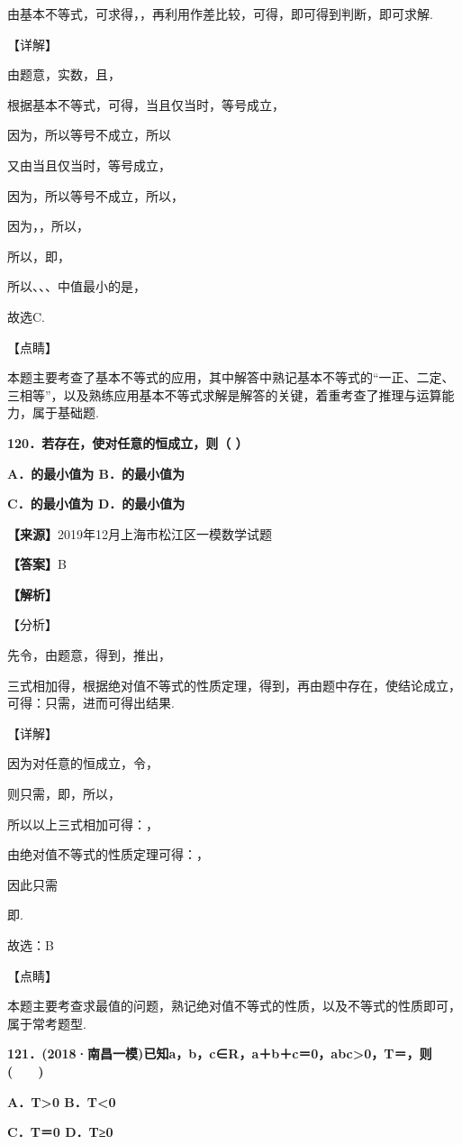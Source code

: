 由基本不等式，可求得，，再利用作差比较，可得，即可得到判断，即可求解.

【详解】

由题意，实数，且，

根据基本不等式，可得，当且仅当时，等号成立，

因为，所以等号不成立，所以

又由当且仅当时，等号成立，

因为，所以等号不成立，所以，

因为，，所以，

所以，即，

所以、、、中值最小的是，

故选C.

【点睛】

本题主要考查了基本不等式的应用，其中解答中熟记基本不等式的``一正、二定、三相等''，以及熟练应用基本不等式求解是解答的关键，着重考查了推理与运算能力，属于基础题.

\textbf{120．若存在，使对任意的恒成立，则（ ）}

\textbf{A．的最小值为 B．的最小值为}

\textbf{C．的最小值为 D．的最小值为}

\textbf{【来源】}2019年12月上海市松江区一模数学试题

\textbf{【答案】}B

\textbf{【解析】}

【分析】

先令，由题意，得到，推出，

三式相加得，根据绝对值不等式的性质定理，得到，再由题中存在，使结论成立，可得：只需，进而可得出结果.

【详解】

因为对任意的恒成立，令，

则只需，即，所以，

所以以上三式相加可得：，

由绝对值不等式的性质定理可得：，

因此只需

即.

故选：B

【点睛】

本题主要考查求最值的问题，熟记绝对值不等式的性质，以及不等式的性质即可，属于常考题型.

\textbf{121．(2018·南昌一模)已知a，b，c∈R，a＋b＋c＝0，abc\textgreater0，T＝，则(　　)}

\textbf{A．T\textgreater0 B．T\textless0}

\textbf{C．T＝0 D．T≥0}

